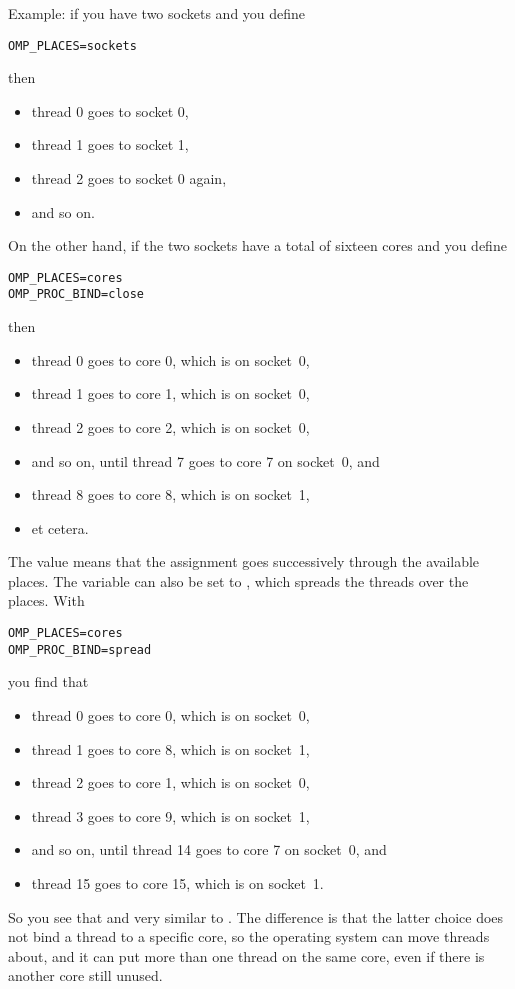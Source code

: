 Example: if you have two sockets and you define
\begin{verbatim}
OMP_PLACES=sockets
\end{verbatim}
then
\begin{itemize}
\item thread 0 goes to socket 0,
\item thread 1 goes to socket 1,
\item thread 2 goes to socket 0 again,
\item and so on.
\end{itemize}
On the other hand, if the two sockets have a total of sixteen cores
and you define
\begin{verbatim}
OMP_PLACES=cores
OMP_PROC_BIND=close
\end{verbatim}
then
\begin{itemize}
\item thread 0 goes to core 0, which is on socket~0,
\item thread 1 goes to core 1, which is on socket~0,
\item thread 2 goes to core 2, which is on socket~0,
\item and so on, until thread 7 goes to core 7 on socket~0, and
\item thread 8 goes to core 8, which is on socket~1,
\item et cetera.
\end{itemize}
The value  means that the assignment goes
successively through the available places.
The variable  can also be set to , which
spreads the threads over the places.
With
\begin{verbatim}
OMP_PLACES=cores
OMP_PROC_BIND=spread
\end{verbatim}
you find that
\begin{itemize}
\item thread 0 goes to core 0, which is on socket~0,
\item thread 1 goes to core 8, which is on socket~1,
\item thread 2 goes to core 1, which is on socket~0,
\item thread 3 goes to core 9, which is on socket~1,
\item and so on, until thread 14 goes to core 7 on socket~0, and
\item thread 15 goes to core 15, which is on socket~1.
\end{itemize}

So you see that  and  very
similar to . The difference is that the latter
choice does not bind a thread to a specific core, so the operating
system can move threads about, and it can put more than one thread on
the same core, even if there is another core still unused.

